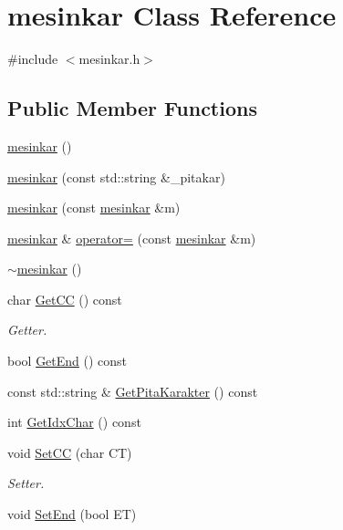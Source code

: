 \hypertarget{classmesinkar}{\section{mesinkar Class Reference}
\label{classmesinkar}
}


{\ttfamily \#include $<$mesinkar.\-h$>$}

\subsection*{Public Member Functions}
\begin{DoxyCompactItemize}
\item 
\hyperlink{classmesinkar_a78f0d2bd02734f1fa5ab25f4d5020f53}{mesinkar} ()
\item 
\hyperlink{classmesinkar_a4ed0550ddb17cb7d52ef298b40a25419}{mesinkar} (const std\-::string \&\-\_\-pitakar)
\item 
\hyperlink{classmesinkar_a853e6f4d155a8a1fee72d8542cea262e}{mesinkar} (const \hyperlink{classmesinkar}{mesinkar} \&m)
\item 
\hyperlink{classmesinkar}{mesinkar} \& \hyperlink{classmesinkar_a7d077059792a15951f6c4afdf028b4e0}{operator=} (const \hyperlink{classmesinkar}{mesinkar} \&m)
\item 
\hyperlink{classmesinkar_a5313524822accd8318c051b161261826}{$\sim$mesinkar} ()
\item 
char \hyperlink{classmesinkar_a9e9b6399d071ea89537fc7ce299687a2}{Get\-C\-C} () const 
\begin{DoxyCompactList}\small\item\em Getter. \end{DoxyCompactList}\item 
bool \hyperlink{classmesinkar_a1752c93e058211953708fb680aa089ff}{Get\-End} () const 
\item 
const std\-::string \& \hyperlink{classmesinkar_abc734d4a2b8a18ba3f7b5ece60934491}{Get\-Pita\-Karakter} () const 
\item 
int \hyperlink{classmesinkar_ae5e1dcbafbb96c115f78e7348b423824}{Get\-Idx\-Char} () const 
\item 
void \hyperlink{classmesinkar_a8a1896878a983aa61e339b8fc1307881}{Set\-C\-C} (char C\-T)
\begin{DoxyCompactList}\small\item\em Setter. \end{DoxyCompactList}\item 
void \hyperlink{classmesinkar_a9524ec9a172858d70cd4634522c209a3}{Set\-End} (bool E\-T)

\end{DoxyCompactItemize}

